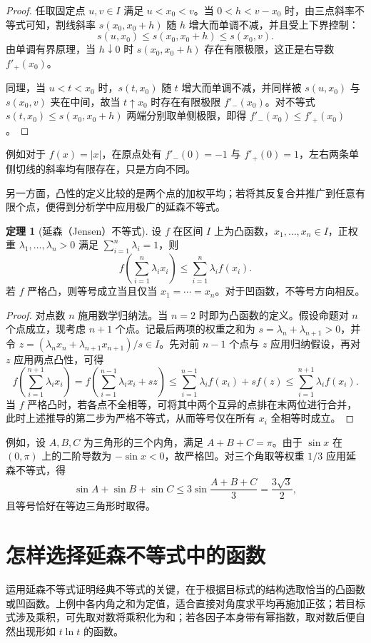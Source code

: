 \documentclass[UTF8,fontset=fandol,a4paper,12pt]{ctexart}
\theoremstyle{definition}
\newtheorem{theorem}{定理}[section]
\begin{document}
\begin{proof}
任取固定点 $u,v\in I$ 满足 $u<x_0<v$。当 $0<h<v-x_0$ 时，由三点斜率不等式可知，割线斜率 $s(x_0,x_0+h)$ 随 $h$ 增大而单调不减，并且受上下界控制：
\[
 s(u,x_0)\le s(x_0,x_0+h)\le s(x_0,v).
\]
由单调有界原理，当 $h\downarrow0$ 时 $s(x_0,x_0+h)$ 存在有限极限，这正是右导数 $f'_+(x_0)$。

同理，当 $u<t<x_0$ 时，$s(t,x_0)$ 随 $t$ 增大而单调不减，并同样被 $s(u,x_0)$ 与 $s(x_0,v)$ 夹在中间，故当 $t\uparrow x_0$ 时存在有限极限 $f'_-(x_0)$。对不等式 $s(t,x_0)\le s(x_0,x_0+h)$ 两端分别取单侧极限，即得 $f'_-(x_0)\le f'_+(x_0)$。
\end{proof}

例如对于 $f(x)=|x|$，在原点处有 $f'_-(0)=-1$ 与 $f'_+(0)=1$，左右两条单侧切线的斜率均有限存在，只是方向不同。

另一方面，凸性的定义比较的是两个点的加权平均；若将其反复合并推广到任意有限个点，便得到分析学中应用极广的延森不等式。

\begin{theorem}[延森（Jensen）不等式]
设 $f$ 在区间 $I$ 上为凸函数，$x_1,\ldots,x_n\in I$，正权重 $\lambda_1,\ldots,\lambda_n>0$ 满足 $\sum_{i=1}^{n}\lambda_i=1$，则
\[
 f\!\left(\sum_{i=1}^{n}\lambda_i x_i\right)
 \le\sum_{i=1}^{n}\lambda_i f(x_i).
\]
若 $f$ 严格凸，则等号成立当且仅当 $x_1=\cdots=x_n$。对于凹函数，不等号方向相反。
\end{theorem}

\begin{proof}
对点数 $n$ 施用数学归纳法。当 $n=2$ 时即为凸函数的定义。假设命题对 $n$ 个点成立，现考虑 $n+1$ 个点。记最后两项的权重之和为 $s=\lambda_n+\lambda_{n+1}>0$，并令 $z=(\lambda_n x_n+\lambda_{n+1}x_{n+1})/s\in I$。先对前 $n-1$ 个点与 $z$ 应用归纳假设，再对 $z$ 应用两点凸性，可得
\[
 f\!\left(\sum_{i=1}^{n+1}\lambda_i x_i\right)
 =f\!\left(\sum_{i=1}^{n-1}\lambda_i x_i+s z\right)
 \le\sum_{i=1}^{n-1}\lambda_i f(x_i)+s f(z)
 \le\sum_{i=1}^{n+1}\lambda_i f(x_i).
\]
当 $f$ 严格凸时，若各点不全相等，可将其中两个互异的点排在末两位进行合并，此时上述推导的第二步为严格不等式，从而等号仅在所有 $x_i$ 全相等时成立。
\end{proof}

例如，设 $A,B,C$ 为三角形的三个内角，满足 $A+B+C=\pi$。由于 $\sin x$ 在 $(0,\pi)$ 上的二阶导数为 $-\sin x<0$，故严格凹。对三个角取等权重 $1/3$ 应用延森不等式，得
\[
 \sin A+\sin B+\sin C\le 3\sin\frac{A+B+C}{3}=\frac{3\sqrt3}{2},
\]
且等号恰好在等边三角形时取得。

\section{怎样选择延森不等式中的函数}
运用延森不等式证明经典不等式的关键，在于根据目标式的结构选取恰当的凸函数或凹函数。上例中各内角之和为定值，适合直接对角度求平均再施加正弦；若目标式涉及乘积，可先取对数将乘积化为和；若各因子本身带有幂指数，取对数后便自然出现形如 $t\ln t$ 的函数。
\end{document}
